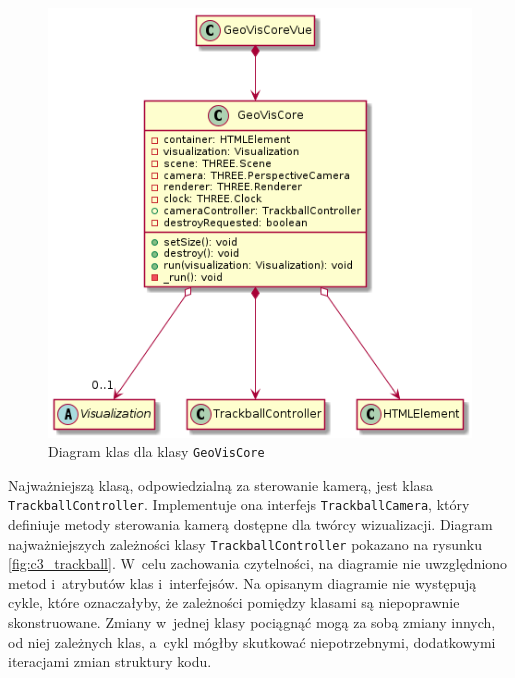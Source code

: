 \begin{figure}
    \centering
    \includegraphics[scale=0.6]{diagrams/out/c3_geo_vis_core.png}
    \caption{Diagram klas dla klasy \texttt{GeoVisCore}}
    \label{fig:c3_geo_vis_core}
\end{figure}

Najważniejszą klasą, odpowiedzialną za sterowanie kamerą, jest klasa \texttt{TrackballController}. Implementuje ona interfejs \texttt{TrackballCamera}, który definiuje metody sterowania kamerą dostępne dla twórcy wizualizacji. Diagram najważniejszych zależności klasy \texttt{TrackballController} pokazano na rysunku \ref{fig:c3_trackball}. W~celu zachowania czytelności, na diagramie nie uwzględniono metod i~atrybutów klas i~interfejsów. Na opisanym diagramie nie występują cykle, które oznaczałyby, że zależności pomiędzy klasami są niepoprawnie skonstruowane. Zmiany w~jednej klasy pociągnąć mogą za sobą zmiany innych, od niej zależnych klas, a~cykl mógłby skutkować niepotrzebnymi, dodatkowymi iteracjami zmian struktury kodu.

